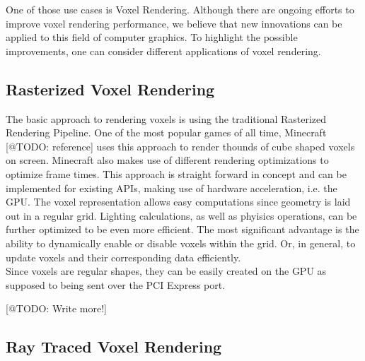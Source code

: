 \noindent
One of those use cases is Voxel Rendering. Although there are ongoing efforts to improve voxel 
rendering performance, we believe that new innovations can be applied to this field of computer 
graphics. To highlight the possible improvements, one can consider different applications of 
voxel rendering. 

\subsection{Rasterized Voxel Rendering}

The basic approach to rendering voxels is using the traditional Rasterized Rendering Pipeline.
One of the most popular games of all time, Minecraft [@TODO: reference] uses this approach to 
render thounds of cube shaped voxels on screen. Minecraft also makes use of different rendering 
optimizations to optimize frame times. This approach is straight forward in concept and can be 
implemented for existing APIs, making use of hardware acceleration, i.e. the \ac{GPU}.
The voxel representation allows easy computations since geometry is laid out in a regular grid.
Lighting calculations, as well as phyisics operations, can be further optimized to be even more 
efficient. The most significant advantage is the ability to dynamically enable or disable voxels 
within the grid. Or, in general, to update voxels and their corresponding data efficiently.\\

\noindent
Since voxels are regular shapes, they can be easily created on the \ac{GPU} as supposed to being 
sent over the PCI Express port. 

[@TODO: Write more!]


\subsection{Ray Traced Voxel Rendering}

